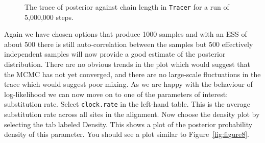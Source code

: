 \documentclass[cup7b, english]{cupbook}
\begin{document}
\begin{figure}[htbp]
\begin{center}
\leavevmode
{}
\end{center}
\caption{The trace of posterior against chain length in \texttt{Tracer} for a run of 5,000,000 steps.}
\label{fig:figure7}
\end{figure}

Again we have chosen options that produce 1000 samples and with an ESS
of about 500 there is still auto-correlation between the samples but 500 effectively independent
samples will now provide a good estimate of the posterior distribution. There are no obvious trends
in the plot which would suggest that the MCMC has not yet converged, and there are no large-scale fluctuations in the
trace which would suggest poor mixing.
As we are happy with the behaviour of log-likelihood we can now move on to one of the
parameters of interest: substitution rate. Select \texttt{clock.rate} in the left-hand table. This
is the average substitution rate across all sites in the alignment. Now choose the density plot by selecting
the tab labeled Density. This shows a plot of the posterior probability density of this
parameter. You should see a plot similar to Figure~\ref{fig:figure8}.
\end{document}
